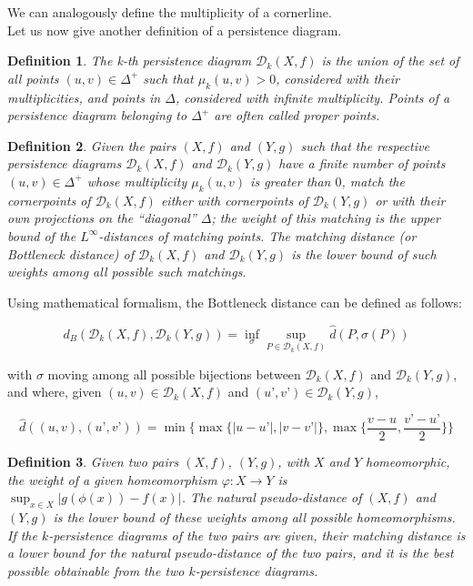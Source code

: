 \documentclass[english, LaM, oneside, noexaminfo]{sapthesis}
\newtheorem{defin}{\bf Definition}[section]
\begin{document}
\noindent We can analogously define the multiplicity of a cornerline. \\

Let us now give another definition of a persistence diagram.
\begin{defin} The \textit{k-th persistence diagram} $\mathcal{D}_k(X,f)$ is the union of the set of all points $(u,v) \in \Delta^{+}$ such that $\mu_{k}(u,v) > 0$, considered with their multiplicities, and points in $\Delta$, considered with infinite multiplicity. Points of a persistence diagram belonging to $\Delta^{+}$ are often called \textit{proper points}.  \end{defin}

\begin{defin} Given the pairs $(X,f)$ and $(Y,g)$ such that the respective persistence diagrams $\mathcal{D}_k(X,f)$ and $\mathcal{D}_k(Y,g)$ have a finite number of points $(u,v) \in \Delta^{+} $ whose multiplicity $\mu_{k}(u,v)$ is greater than $0$, match the cornerpoints of $\mathcal{D}_k(X,f)$ either with cornerpoints of $\mathcal{D}_k(Y,g)$ or with their own projections on the ``diagonal'' $\Delta$; the weight of this matching is the upper bound
of the $L^{\infty}$-distances of matching points. The \textit{matching distance} (or \textit{Bottleneck
distance}) of $\mathcal{D}_k(X,f)$ and $\mathcal{D}_k(Y,g)$ is the lower bound of such weights among all possible such matchings.   \end{defin}

Using mathematical formalism, the Bottleneck distance can be defined as follows:

$$d_B(\mathcal{D}_k(X,f),\mathcal{D}_k(Y,g)) = \inf_{\sigma} {\sup_{P \in \mathcal{D}_k(X,f)} \hat{d}(P, \sigma(P))} $$

with $\sigma$ moving among all possible bijections between $\mathcal{D}_k(X,f)$ and $\mathcal{D}_k(Y,g)$, and where, given $(u,v) \in \mathcal{D}_k(X,f)$ and $(u’,v’) \in \mathcal{D}_k(Y,g)$, 

$$\hat{d}((u,v),(u’,v’)) = \min \biggl\{\max\{|u-u’|,|v-v’|\}, \max\biggl\{\frac{v-u}{2}, \frac{v’-u’}{2}\biggl\}\biggl\}$$

\begin{defin}  Given two pairs $(X, f)$, $(Y, g)$, with $X$ and $Y$ homeomorphic, the weight of a given homeomorphism $ \varphi: X \rightarrow Y$ is $\sup_{x \in X} {|g(\phi(x)) - f(x)|}$.
The \textit{natural pseudo-distance} of $(X, f)$ and $(Y, g)$ is the lower bound of these weights among
all possible homeomorphisms. If the $k$-persistence diagrams of the two pairs are given, their
matching distance is a lower bound for the natural pseudo-distance of the two
pairs, and it is the best possible obtainable from the two $k$-persistence diagrams.\end{defin}
\end{document}
